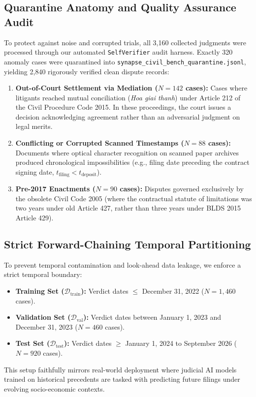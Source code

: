 \documentclass[11pt,a4paper]{article}
\begin{document}
\subsection{Quarantine Anatomy and Quality Assurance Audit}
To protect against noise and corrupted trials, all 3,160 collected judgments were processed through our automated \texttt{SelfVerifier} audit harness. Exactly 320 anomaly cases were quarantined into \texttt{synapse\_civil\_bench\_quarantine.jsonl}, yielding 2,840 rigorously verified clean dispute records:
\begin{enumerate}[leftmargin=*]
    \item \textbf{Out-of-Court Settlement via Mediation ($N = 142$ cases):} Cases where litigants reached mutual conciliation (\textit{Hoa giai thanh}) under Article 212 of the Civil Procedure Code 2015. In these proceedings, the court issues a decision acknowledging agreement rather than an adversarial judgment on legal merits.
    \item \textbf{Conflicting or Corrupted Scanned Timestamps ($N = 88$ cases):} Documents where optical character recognition on scanned paper archives produced chronological impossibilities (e.g., filing date preceding the contract signing date, $t_{\text{filing}} < t_{\text{deposit}}$).
    \item \textbf{Pre-2017 Enactments ($N = 90$ cases):} Disputes governed exclusively by the obsolete Civil Code 2005 (where the contractual statute of limitations was two years under old Article 427, rather than three years under BLDS 2015 Article 429).
\end{enumerate}

\subsection{Strict Forward-Chaining Temporal Partitioning}
To prevent temporal contamination and look-ahead data leakage, we enforce a strict temporal boundary:
\begin{itemize}[leftmargin=*]
    \item \textbf{Training Set ($\mathcal{D}_{\text{train}}$):} Verdict dates $\le$ December 31, 2022 ($N = 1{,}460$ cases).
    \item \textbf{Validation Set ($\mathcal{D}_{\text{val}}$):} Verdict dates between January 1, 2023 and December 31, 2023 ($N = 460$ cases).
    \item \textbf{Test Set ($\mathcal{D}_{\text{test}}$):} Verdict dates $\ge$ January 1, 2024 to September 2026 ($N = 920$ cases).
\end{itemize}
This setup faithfully mirrors real-world deployment where judicial AI models trained on historical precedents are tasked with predicting future filings under evolving socio-economic contexts.
\end{document}
